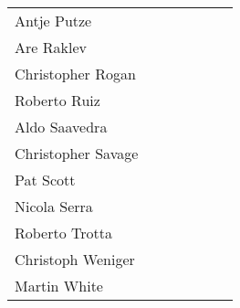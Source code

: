 \begin{center}
\begin{tabular*}{0.99\textwidth}{@{\extracolsep{\fill}}|lcccccc|}
  Antje Putze           & \M &    & \M &    & \M &    \\
  Are Raklev            &    & \M &    & \M &    &    \\
  Christopher Rogan     &    & \M &    & \M &    &    \\
  Roberto Ruiz          & \M & \M & \M &    &    &    \\
  Aldo Saavedra         & \M & \M &    & \M &    &    \\
  Christopher Savage    &    &    & \M &    & \C &    \\
  Pat Scott             & \C & \M & \M & \M & \M &    \\
  Nicola Serra          &    &    &    & \M &    & \M \\
  Roberto Trotta        &    & \M & \M &    & \M &    \\
  Christoph Weniger     & \M & \M & \M &    & \C &    \\
  Martin White          &    & \M &    & \C &    &    \\
  \hline
\end{tabular*}
\end{center}


